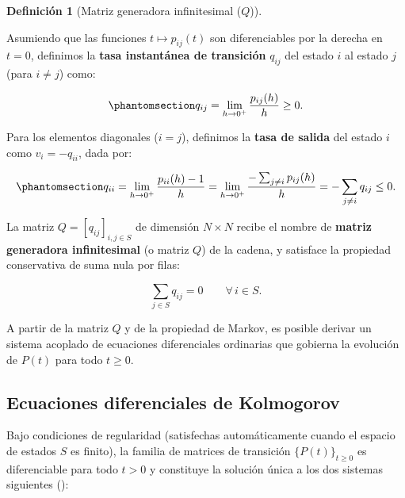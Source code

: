 \documentclass[
  spanish,
  us-letterpaper,
]{scrreprt}
\theoremstyle{definition}
\newtheorem{definition}{Definición}[chapter]
\theoremstyle{remark}
\begin{document}
\begin{definition}[Matriz generadora infinitesimal
(\(Q\))]\protect\hypertarget{def-matriz-generadora}{}\label{def-matriz-generadora}

Asumiendo que las funciones \(t \mapsto p_{ij}(t)\) son diferenciables
por la derecha en \(t = 0\), definimos la \textbf{tasa instantánea de
transición} \(q_{ij}\) del estado \(i\) al estado \(j\) (para
\(i \neq j\)) como:

\begin{equation}\phantomsection\label{eq-tasa-transicion}{
q_{ij} = \lim_{h \to 0^+} \frac{p_{ij}(h)}{h} \ge 0.
}\end{equation}

Para los elementos diagonales (\(i = j\)), definimos la \textbf{tasa de
salida} del estado \(i\) como \(v_i = -q_{ii}\), dada por:

\begin{equation}\phantomsection\label{eq-tasa-salida}{
q_{ii} = \lim_{h \to 0^+} \frac{p_{ii}(h) - 1}{h} = \lim_{h \to 0^+} \frac{-\sum_{j \neq i} p_{ij}(h)}{h} = -\sum_{j \neq i} q_{ij} \le 0.
}\end{equation}

La matriz \(Q = [q_{ij}]_{i,j \in S}\) de dimensión \(N \times N\)
recibe el nombre de \textbf{matriz generadora infinitesimal} (o matriz
\(Q\)) de la cadena, y satisface la propiedad conservativa de suma nula
por filas:

\[
\sum_{j \in S} q_{ij} = 0 \qquad \forall\, i \in S.
\]

\end{definition}

A partir de la matriz \(Q\) y de la propiedad de Markov, es posible
derivar un sistema acoplado de ecuaciones diferenciales ordinarias que
gobierna la evolución de \(P(t)\) para todo \(t \ge 0\).

\label{imp-ecuaciones-kolmogorov}
\subsection{Ecuaciones diferenciales de
Kolmogorov}\label{ecuaciones-diferenciales-de-kolmogorov}

Bajo condiciones de regularidad (satisfechas automáticamente cuando el
espacio de estados \(S\) es finito), la familia de matrices de
transición \(\{P(t)\}_{t \ge 0}\) es diferenciable para todo \(t > 0\) y
constituye la solución única a los dos sistemas siguientes
():
\end{document}
